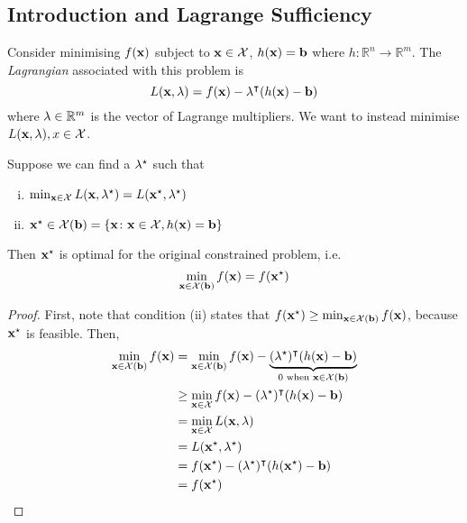 \subsection{Introduction and Lagrange Sufficiency}
Consider minimising \(f(\vb x)\) subject to \(\vb x \in \mathcal X\), \(h(\vb x) = \vb b\) where \(h \colon \mathbb R^n \to \mathbb R^m\).
The \textit{Lagrangian} associated with this problem is
\[
	L(\vb x, \vb \lambda) = f(\vb x) - \vb \lambda^\intercal(h(\vb x) - \vb b)
\]
where \(\vb\lambda \in \mathbb R^m\) is the vector of Lagrange multipliers.
We want to instead minimise \(L(\vb x, \vb \lambda), x \in \mathcal X\).
\begin{theorem}
	Suppose we can find a \(\vb \lambda^\star\) such that
	\begin{enumerate}[(i)]
		\item \(\min_{\vb x \in \mathcal X} L(\vb x, \vb \lambda^\star) = L(\vb x^\star, \vb\lambda^\star)\)
		\item \(\vb x^\star \in \mathcal X(\vb b) = \qty{\vb x \colon \vb x \in \mathcal X, h(\vb x) = \vb b}\)
	\end{enumerate}
	Then \(\vb x^\star\) is optimal for the original constrained problem, i.e.
	\[
		\min_{\vb x \in \mathcal X(\vb b)} f(\vb x) = f(\vb x^\star)
	\]
\end{theorem}
\begin{proof}
	First, note that condition (ii) states that \(f(\vb x^\star) \geq \min_{\vb x \in \mathcal X(\vb b)}f(\vb x)\), because \(\vb x^\star\) is feasible.
	Then,
	\begin{align*}
		\min_{\vb x \in \mathcal X(\vb b)}f(\vb x) & = \min_{\vb x \in \mathcal X(\vb b)} f(\vb x) - \underbrace{(\vb\lambda^\star)^\intercal (h(\vb x) - \vb b)}_{0 \text{ when } \vb x \in \mathcal X(\vb b)} \\
		                                           & \geq \min_{\vb x \in \mathcal X} f(\vb x) - (\vb\lambda^\star)^\intercal (h(\vb x) - \vb b)                                                                \\
		                                           & = \min_{\vb x \in \mathcal X} L(\vb x, \vb \lambda)                                                                                                \\
		                                           & = L(\vb x^\star, \vb \lambda^\star)                                                                                                                \\
		                                           & = f(\vb x^\star) - (\vb\lambda^\star)^\intercal (h(\vb x^\star) - \vb b)                                                                                   \\
		                                           & = f(\vb x^\star)
	\end{align*}
\end{proof}

